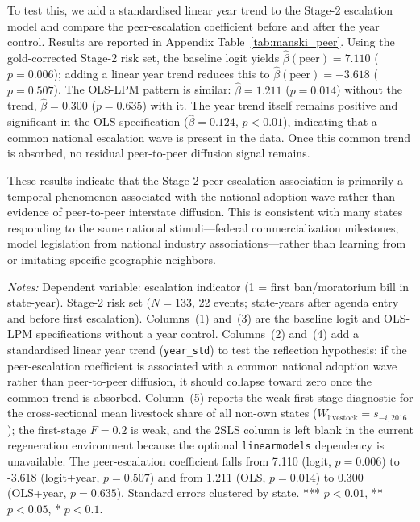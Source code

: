 \documentclass[12pt]{article}
\begin{document}
\begin{appendices}
To test this, we add a standardised linear year trend to the Stage-2 escalation model and compare the peer-escalation coefficient before and after the year control.  Results are reported in Appendix Table~\ref{tab:manski_peer}.  Using the gold-corrected Stage-2 risk set, the baseline logit yields $\hat{\beta}(\text{peer}) = 7.110$ ($p = 0.006$); adding a linear year trend reduces this to $\hat{\beta}(\text{peer}) = -3.618$ ($p = 0.507$).  The OLS-LPM pattern is similar: $\hat{\beta} = 1.211$ ($p = 0.014$) without the trend, $\hat{\beta} = 0.300$ ($p = 0.635$) with it.  The year trend itself remains positive and significant in the OLS specification ($\hat{\beta} = 0.124$, $p < 0.01$), indicating that a common national escalation wave is present in the data.  Once this common trend is absorbed, no residual peer-to-peer diffusion signal remains.

These results indicate that the Stage-2 peer-escalation association is primarily a temporal phenomenon associated with the national adoption wave rather than evidence of peer-to-peer interstate diffusion.  This is consistent with many states responding to the same national stimuli---federal commercialization milestones, model legislation from national industry associations---rather than learning from or imitating specific geographic neighbors.

\begin{table}[htbp]
\centering
\begin{threeparttable}
\caption{Manski (1993) Reflection Test: Stage-2 Peer Escalation and Year Trend}
\label{tab:manski_peer}
\small

\begin{tablenotes}[flushleft]
\footnotesize
\item \textit{Notes:} Dependent variable: escalation indicator (1 = first ban/moratorium bill in state-year).  Stage-2 risk set ($N=133$, 22 events; state-years after agenda entry and before first escalation).  Columns~(1) and~(3) are the baseline logit and OLS-LPM specifications without a year control.  Columns~(2) and~(4) add a standardised linear year trend (\texttt{year\_std}) to test the \citet{manski1993} reflection hypothesis: if the peer-escalation coefficient is associated with a common national adoption wave rather than peer-to-peer diffusion, it should collapse toward zero once the common trend is absorbed.  Column~(5) reports the weak first-stage diagnostic for the cross-sectional mean livestock share of all non-own states ($W_{\text{livestock}} = \bar{s}_{-i,2016}$); the first-stage $F = 0.2$ is weak, and the 2SLS column is left blank in the current regeneration environment because the optional \texttt{linearmodels} dependency is unavailable.  The peer-escalation coefficient falls from 7.110 (logit, $p = 0.006$) to -3.618 (logit+year, $p = 0.507$) and from 1.211 (OLS, $p = 0.014$) to 0.300 (OLS+year, $p = 0.635$).  Standard errors clustered by state.  *** $p<0.01$, ** $p<0.05$, * $p<0.1$.
\end{tablenotes}
\end{threeparttable}
\end{table}


\end{appendices}
\end{document}
